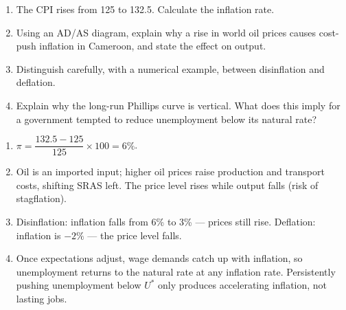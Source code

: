\documentclass[11pt]{article}
\begin{document}
\begin{exercice}[Practice]
\begin{enumerate}
\item The CPI rises from 125 to 132.5. Calculate the inflation rate.
\item Using an AD/AS diagram, explain why a rise in world oil prices causes cost-push inflation in Cameroon, and state the effect on output.
\item Distinguish carefully, with a numerical example, between disinflation and deflation.
\item Explain why the long-run Phillips curve is vertical. What does this imply for a government tempted to reduce unemployment below its natural rate?
\end{enumerate}
\end{exercice}

\begin{corrige}[Exercise]
\begin{enumerate}
\item $\pi = \dfrac{132.5 - 125}{125}\times 100 = 6\%$.
\item Oil is an imported input; higher oil prices raise production and transport costs, shifting SRAS left. The price level rises while output falls (risk of stagflation).
\item Disinflation: inflation falls from 6\% to 3\% --- prices still rise. Deflation: inflation is $-2\%$ --- the price level falls.
\item Once expectations adjust, wage demands catch up with inflation, so unemployment returns to the natural rate at any inflation rate. Persistently pushing unemployment below $U^{*}$ only produces accelerating inflation, not lasting jobs.
\end{enumerate}
\end{corrige}
\end{document}
